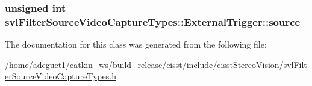 \hypertarget{classsvl_filter_source_video_capture_types_1_1_external_trigger_a90c5c2fc64176eb2220cdd9890795301}{
\subsubsection[{source}]{\setlength{\rightskip}{0pt plus 5cm}unsigned int svl\-Filter\-Source\-Video\-Capture\-Types\-::\-External\-Trigger\-::source}}\label{classsvl_filter_source_video_capture_types_1_1_external_trigger_a90c5c2fc64176eb2220cdd9890795301}


The documentation for this class was generated from the following file\-:\begin{DoxyCompactItemize}
\item 
/home/adeguet1/catkin\-\_\-ws/build\-\_\-release/cisst/include/cisst\-Stereo\-Vision/\hyperlink{svl_filter_source_video_capture_types_8h}{svl\-Filter\-Source\-Video\-Capture\-Types.\-h}\end{DoxyCompactItemize}
